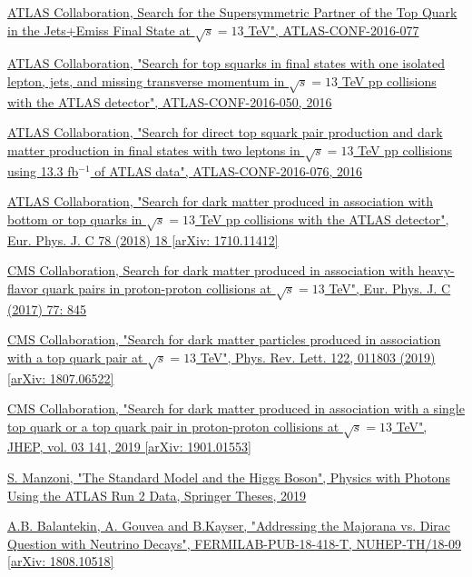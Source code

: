 \documentclass[a4paper, 10pt, openright]{report}
\begin{document}
\begin{thebibliography}{1}
\href{http://inspirehep.net/record/1480057}{ATLAS Collaboration,
Search for the Supersymmetric Partner of the Top Quark in the Jets+Emiss Final State at $\sqrt{s} = 13$ TeV",
ATLAS-CONF-2016-077
}

\href{http://inspirehep.net/record/1480030/}{ATLAS Collaboration,
"Search for top squarks in final states with one isolated lepton, jets, and missing transverse momentum in $\sqrt{s} = 13$ TeV pp collisions with the ATLAS detector",
ATLAS-CONF-2016-050, 2016}

\href{http://inspirehep.net/record/1480056}{ATLAS Collaboration,
"Search for direct top squark pair production and dark matter production in final states with two leptons in $\sqrt{s} = 13$ TeV pp collisions using 13.3 fb$^{-1}$ of ATLAS data",
ATLAS-CONF-2016-076, 2016}

\href{https://arxiv.org/abs/1710.11412}{ATLAS Collaboration,
"Search for dark matter produced in association with bottom or top quarks in $\sqrt{s} = 13$ TeV pp collisions with the ATLAS detector",
Eur. Phys. J. C 78 (2018) 18 [arXiv: 1710.11412]}

\href{http://inspirehep.net/record/1603635}{CMS Collaboration,
Search for dark matter produced in association with heavy-flavor quark pairs in proton-proton collisions at $\sqrt{s} = 13$ TeV",
Eur. Phys. J. C (2017) 77: 845}

\href{https://arxiv.org/abs/1807.06522}{CMS Collaboration,
"Search for dark matter particles produced in association with a top quark pair at $\sqrt{s} = 13$ TeV",
Phys. Rev. Lett. 122, 011803 (2019) [arXiv: 1807.06522]}

\href{https://arxiv.org/abs/1901.01553}{CMS Collaboration,
"Search for dark matter produced in association with a single top quark or a top quark pair in proton-proton collisions at $\sqrt{s} = 13$ TeV",
JHEP, vol. 03 141, 2019 [arXiv: 1901.01553]}

\href{https://link.springer.com/chapter/10.1007/978-3-030-24370-8_2#citeas}{S. Manzoni, 
"The Standard Model and the Higgs Boson",
Physics with Photons Using the ATLAS Run 2 Data, Springer Theses, 2019
}

\href{https://arxiv.org/abs/1808.10518}{A.B. Balantekin, A. Gouvea and B.Kayser,
"Addressing the Majorana vs. Dirac Question with Neutrino Decays",
FERMILAB-PUB-18-418-T, NUHEP-TH/18-09 [arXiv: 1808.10518]
}


\end{thebibliography}
\end{document}
